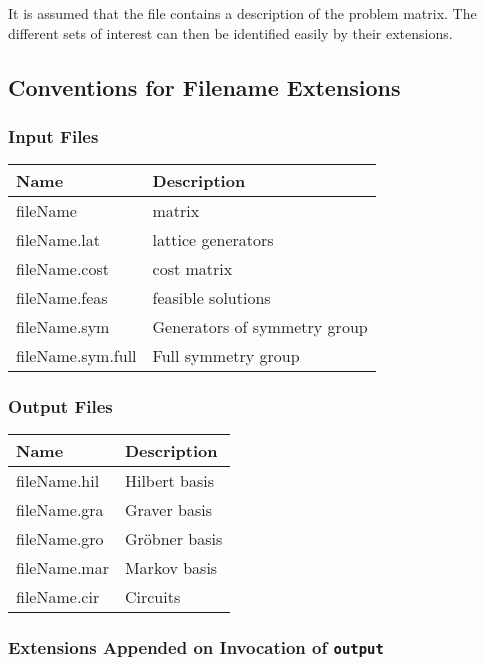 \documentclass[12pt]{article}
\newcommand\File{\begingroup \urlstyle{sf}\Url}
\newcommand\Command{\begingroup \urlstyle{sf}\Url}
\theoremstyle{definition}
\begin{document}
It is assumed that the file \File{fileName} contains a description of the
problem matrix. The different sets of interest can then be identified
easily by their extensions.

\subsection{Conventions for Filename Extensions}
\subsubsection{Input Files}

\begin{tabular}{|l|l|}
\hline
Name & Description\\
\hline 
fileName & matrix\\
fileName.lat & lattice generators\\
fileName.cost & cost matrix\\
fileName.feas & feasible solutions\\
fileName.sym & Generators of symmetry group\\
fileName.sym.full & Full symmetry group\\
\hline 
\end{tabular}

\subsubsection{Output Files}
\begin{tabular}{|l|l|}
\hline
Name & Description\\
\hline 
fileName.hil & Hilbert basis\\
fileName.gra & Graver basis\\
fileName.gro & Gr\"obner basis\\
fileName.mar & Markov basis\\
fileName.cir & Circuits\\
\hline 
\end{tabular}


\subsubsection{Extensions Appended on Invocation of {\tt output}} %
\end{document}
